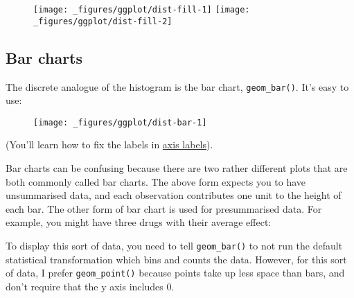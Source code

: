 \begin{figure}[H]
  \texttt{[image: \_figures/ggplot/dist-fill-1]}%
  \texttt{[image: \_figures/ggplot/dist-fill-2]}
\end{figure}

\subsection{Bar charts}\label{sub:bar}

The discrete analogue of the histogram is the bar chart,
\texttt{geom\_bar()}. It's easy to use: 

\begin{Shaded}
\begin{Highlighting}[]
\StringTok{ }
\StringTok{  }\NormalTok{()}
\end{Highlighting}
\end{Shaded}

\begin{figure}[H]
  \texttt{[image: \_figures/ggplot/dist-bar-1]}
\end{figure}

(You'll learn how to fix the labels in \hyperref[sub:theme-axis]{axis
labels}).

Bar charts can be confusing because there are two rather different plots
that are both commonly called bar charts. The above form expects you to
have unsummarised data, and each observation contributes one unit to the
height of each bar. The other form of bar chart is used for
presummarised data. For example, you might have three drugs with their
average effect:

\begin{Shaded}
\begin{Highlighting}[]
\StringTok{ }\NormalTok{(}
   \NormalTok{(}\NormalTok{, }\NormalTok{, }\NormalTok{),}
   \NormalTok{(}\NormalTok{, }\NormalTok{, }\NormalTok{)}
\NormalTok{)}
\end{Highlighting}
\end{Shaded}

To display this sort of data, you need to tell \texttt{geom\_bar()} to
not run the default statistical transformation which bins and counts the
data. However, for this sort of data, I prefer \texttt{geom\_point()}
because points take up less space than bars, and don't require that the
y axis includes 0.

